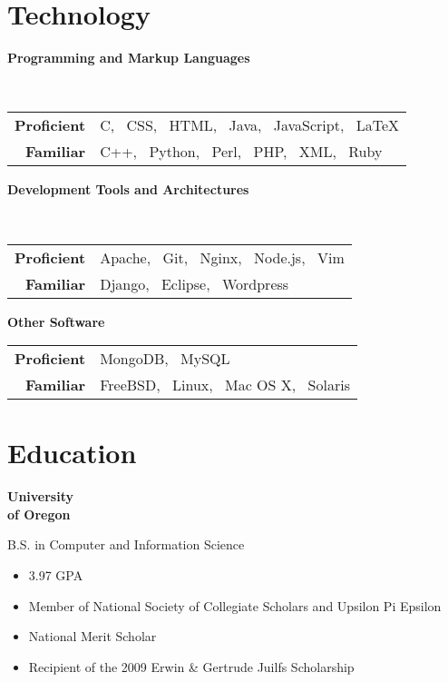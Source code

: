 \documentclass[10pt,letterpaper]{article}
\newenvironment{topic}[1]{
\begin{minipage}[t]{0.15\linewidth}\begin{flushleft}\begin{flushright}\textbf{#1}\end{flushright}\end{flushleft}\end{minipage}\hspace{1em}\vrule\hspace{1em}\begin{minipage}[t]{0.80\linewidth}\begin{flushright}\begin{flushleft}
}{
\end{flushleft}\end{flushright}\end{minipage}\vspace{1em}
}
\begin{document}
\section{Technology}
\begin{topic}{\textnormal{Programming and Markup Languages}} \hfill \\
  \begin{tabular}{r l}
    \textbf{Proficient} & C, \ CSS, \ HTML, \ Java, \ JavaScript, \ \LaTeX \\
    \textbf{Familiar} & C++, \ Python, \ Perl, \ PHP, \ XML, \ Ruby
  \end{tabular}
  \newline
\end{topic}

\begin{topic}{\textnormal{Development Tools and Architectures}} \hfill \\
  \begin{tabular}{r l}
    \textbf{Proficient} & Apache, \ Git, \ Nginx, \ Node.js, \ Vim \\
    \textbf{Familiar} &  Django, \ Eclipse, \ Wordpress
  \end{tabular}
  \newline
\end{topic}

\begin{topic}{\textnormal{Other Software}}
  \begin{tabular}{r l}
    \textbf{Proficient} &  MongoDB, \ MySQL \\
    \textbf{Familiar} & FreeBSD, \ Linux, \ Mac OS X, \ Solaris
  \end{tabular}
\end{topic}

\section{Education}
\begin{topic}{University \\ of Oregon}
  B.S. in Computer and Information Science
  \begin{itemize}
    \setlength{\itemsep}{0em}
    \setlength{\parskip}{0em}
    \item 3.97 GPA
    \item Member of National Society of Collegiate Scholars and Upsilon Pi Epsilon
    \item National Merit Scholar
    \item Recipient of the 2009 Erwin \& Gertrude Juilfs Scholarship
  \end{itemize}
\end{topic}
\end{document}
